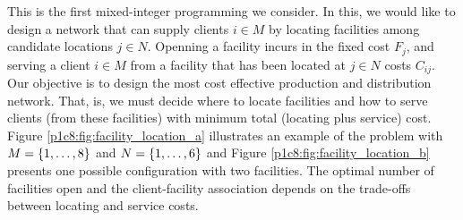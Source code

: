 This is the first mixed-integer programming we consider. In this, we would like to design a network that can supply clients $i \in M$ by locating facilities among candidate locations $j \in N$. Openning a facility incurs in the fixed cost $F_j$, and serving a client $i \in M$ from a facility that has been located at $j \in N$ costs $C_{ij}$. Our objective is to design the most cost effective production and distribution network. That, is, we must decide where to locate facilities and how to serve clients (from these facilities) with minimum total (locating plus service) cost. Figure \ref{p1c8:fig:facility_location_a} illustrates an example of the problem with $M = \left\{ 1,\dots,8 \right \}$ and $N = \left\{ 1,\dots,6 \right \}$ and Figure \ref{p1c8:fig:facility_location_b} presents one possible configuration with two facilities. The optimal number of facilities open and the client-facility association depends on the trade-offs between locating and service costs.	

